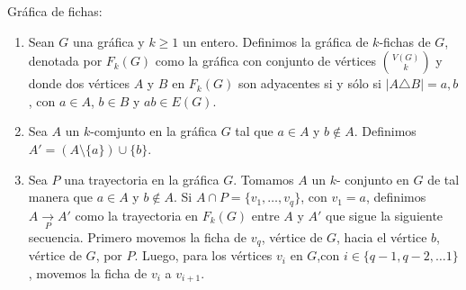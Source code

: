 \begin{definicion} Gr\'afica de fichas:
    \label{def:fichas}
    \begin{enumerate}
        \item Sean $G$ una gr\'afica y $k \geq 1$ un entero. Definimos la
        gr\'afica de $k$-fichas de $G$, denotada por $F_k(G)$ como la
        gr\'afica con conjunto de v\'ertices $\binom{V(G)}{k}$ y donde dos
        v\'ertices $A$ y $B$ en $F_k(G)$ son adyacentes si y s\'olo si $|A
        \triangle B| ={a,b}$, con $a \in A$, $b \in B$ y $ab \in E(G)$.
        \item Sea $A$ un $k$-comjunto en la gr\'afica $G$ tal que $a \in A$
        y $b\notin A$. Definimos $A'= (A \setminus \{a\}) \cup \{b\}$.
        \item Sea $P$ una trayectoria en la gr\'afica $G$. Tomamos $A$ un
        $k$- conjunto en $G$ de tal manera que $a\in A$ y $b \notin A$. Si
        $A\cap P =\{v_1, \dots, v_q\}$, con $v_1 = a$, definimos $A
        \xrightarrow[P]{} A'$ como la trayectoria en $F_k(G)$ entre $A$ y
        $A'$ que sigue la siguiente secuencia. Primero movemos la ficha de
        $v_q$, v\'ertice de $G$, hacia el v\'ertice $b$, v\'ertice de $G$,
        por $P$. Luego, para los v\'ertices $v_i$ en $G$,con $i \in \{q-1,
        q-2, \dots 1\}$, movemos la ficha de $v_i$ a $v_{i+1}$. 
    \end{enumerate}
\end{definicion}

